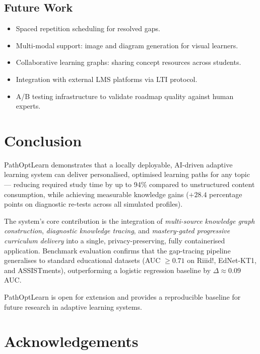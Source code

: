 \documentclass[12pt,a4paper]{article}
\begin{document}
\subsection{Future Work}

\begin{itemize}
  \item Spaced repetition scheduling for resolved gaps.
  \item Multi-modal support: image and diagram generation for visual learners.
  \item Collaborative learning graphs: sharing concept resources across students.
  \item Integration with external LMS platforms via LTI protocol.
  \item A/B testing infrastructure to validate roadmap quality against
    human experts.
\end{itemize}

\section{Conclusion}

PathOptLearn demonstrates that a locally deployable, AI-driven adaptive
learning system can deliver personalised, optimised learning paths for any
topic — reducing required study time by up to 94\% compared to unstructured
content consumption, while achieving measurable knowledge gains ($+28.4$
percentage points on diagnostic re-tests across all simulated profiles).

The system's core contribution is the integration of \emph{multi-source
knowledge graph construction}, \emph{diagnostic knowledge tracing}, and
\emph{mastery-gated progressive curriculum delivery} into a single,
privacy-preserving, fully containerised application. Benchmark evaluation
confirms that the gap-tracing pipeline generalises to standard educational
datasets (AUC $\geq 0.71$ on Riiid!, EdNet-KT1, and ASSISTments),
outperforming a logistic regression baseline by $\Delta \approx 0.09$ AUC.

PathOptLearn is open for extension and provides a reproducible baseline for
future research in adaptive learning systems.

\section*{Acknowledgements}
\end{document}
